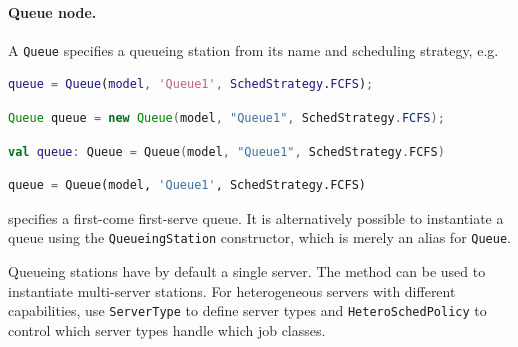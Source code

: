 \paragraph{Queue node.}
A \texttt{Queue} specifies a queueing station from its name and scheduling strategy, e.g.
\begin{MATLAB}
\begin{lstlisting}[language = matlab]
queue = Queue(model, 'Queue1', SchedStrategy.FCFS);
\end{lstlisting}
\end{MATLAB}
\begin{JAVA}
\begin{lstlisting}[language = java, basicstyle=\ttfamily\scriptsize]
Queue queue = new Queue(model, "Queue1", SchedStrategy.FCFS);
\end{lstlisting}
\end{JAVA}
\begin{KOTLIN}
\begin{lstlisting}[language = kotlin, basicstyle=\ttfamily\scriptsize]
val queue: Queue = Queue(model, "Queue1", SchedStrategy.FCFS)
\end{lstlisting}
\end{KOTLIN}
\begin{PYTHON}
\begin{lstlisting}[language=python]
queue = Queue(model, 'Queue1', SchedStrategy.FCFS)
\end{lstlisting}
\end{PYTHON}
specifies a first-come first-serve queue. It is alternatively possible to instantiate a queue using the \texttt{QueueingStation} constructor, which is merely an alias for \texttt{Queue}.

Queueing stations have by default a single server. The  method can be used to instantiate multi-server stations. For heterogeneous servers with different capabilities, use \texttt{ServerType} to define server types and \texttt{HeteroSchedPolicy} to control which server types handle which job classes.

